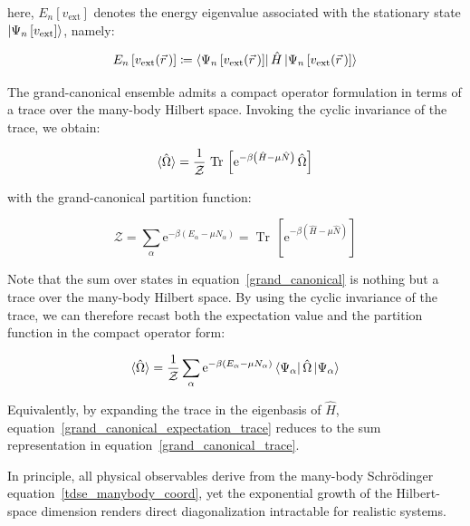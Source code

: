 here, $E_n\left[v_\mathrm{ext}\right]$ denotes the energy eigenvalue associated with the stationary state $\ket{\Psi_n\left[v_\mathrm{ext}\right]}$, namely:

\begin{equation}
    E_n\left[v_\mathrm{ext}(\vec{r}\,)\right] \coloneqq
    \bra{\Psi_n\left[v_\mathrm{ext}(\vec{r}\,)\right]}\hat{H}\ket{\Psi_n\left[v_\mathrm{ext}(\vec{r}\,)\right]}
\label{eigenenergy_as_expectation_value}
\end{equation}

The grand-canonical ensemble admits a compact operator formulation in terms of a trace over the many-body Hilbert space.
Invoking the cyclic invariance of the trace, we obtain:

\begin{equation}
    \braket{\hat{\Omega}}
    = \frac{1}{\mathcal{Z}}\,\operatorname{Tr}\,\left[\mathrm{e}^{-\beta\left(\hat{H}-\mu \hat{N}\right)}\,\hat{\Omega}\right]
\label{grand_canonical_expectation_trace}
\end{equation}

with the grand-canonical partition function:

\begin{equation}
    \mathcal{Z}
    =\sum_{\alpha}\mathrm{e}^{-\beta\left(E_{\alpha}-\mu N_{\alpha}\right)} 
    =\operatorname{Tr}\,\left[\mathrm{e}^{-\beta\left(\hat{H}-\mu \hat{N}\right)}\right]
\label{grand_partition_function_trace}
\end{equation}

Note that the sum over states in equation~\eqref{grand_canonical} is nothing but a trace over the many-body Hilbert space.  By using the cyclic invariance of the trace, we can therefore recast both the expectation value and the partition function in the compact operator form:

\begin{equation}
    \braket{\hat\Omega}
    = \frac{1}{\mathcal{Z}}\sum_\alpha \mathrm{e}^{-\beta(E_\alpha-\mu N_\alpha)}\bra{\Psi_\alpha}\hat\Omega\ket{\Psi_\alpha} 
\label{grand_canonical_trace}
\end{equation}

Equivalently, by expanding the trace in the eigenbasis of $\hat{H}$, equation~\eqref{grand_canonical_expectation_trace} reduces to the sum representation in equation~\eqref{grand_canonical_trace}.

In principle, all physical observables derive from the many-body Schrödinger equation~\eqref{tdse_manybody_coord}, yet the exponential growth of the Hilbert-space dimension renders direct diagonalization intractable for realistic systems.

